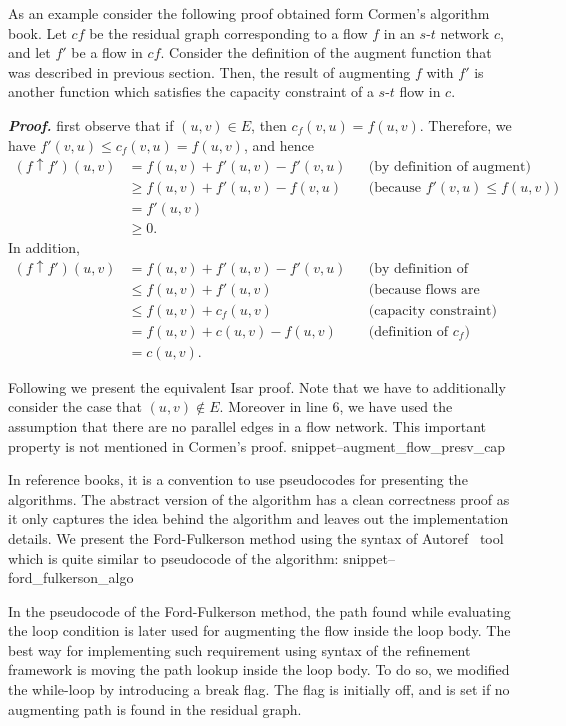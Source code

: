 \documentclass{llncs}
\newcommand{\Snippet}[1]{\csname snippet--#1\endcsname}
\begin{document}
As an example consider the following proof obtained form Cormen's algorithm book. Let $cf$ be the residual graph corresponding to a flow $f$ in an $s$-$t$ network $c$, and let $f'$ be a flow in $cf$. Consider the definition of the augment function that was described in previous section. Then, the result of augmenting $f$ with $f'$ is another function which satisfies the capacity constraint of a $s$-$t$ flow in $c$.

\emph{\textbf{Proof.}} first observe that if $(u, v) \in E$, then $c_f(v, u) = f(u, v)$. Therefore, we have $f'(v,u) \leq c_f(v, u) = f(u, v)$, and hence
	\begin{align*}
	(f \uparrow f') (u, v) &= f(u, v) + f'(u, v) - f'(v, u)  && \text{(by definition of augment)} \\
	& \geq f(u, v) + f'(u, v) - f(v, u) && \text{(because $f'(v,u) \leq f(u, v)$)} \\
	& = f'(u, v) \\
	& \geq 0.
	\end{align*}
In addition,
	\begin{align*}
	(f \uparrow f') (u, v) &= f(u, v) + f'(u, v) - f'(v, u)  && \text{(by definition of augment)} \\
	& \leq f(u, v) + f'(u, v) && \text{(because flows are nonnegative)} \\
	& \leq f(u, v) + c_f(u, v) &&  \text{(capacity constraint)} \\
	& = f(u, v) + c(u, v) - f(u, v) && \text{(definition of $c_f$)} \\
	& = c (u, v).
	\end{align*}

Following we present the equivalent Isar proof. Note that we have to additionally consider the case that $(u, v) \notin E$. Moreover in line 6, we have used the assumption that there are no parallel edges in a flow network. This important property is not mentioned in Cormen's proof.
\Snippet{augment_flow_presv_cap}


In reference books, it is a convention to use pseudocodes for presenting the algorithms. The abstract version of the algorithm has a clean correctness proof as it only captures the idea behind the algorithm and leaves out the implementation details. We present the Ford-Fulkerson method using the syntax of Autoref~\cite{La13} tool which is quite similar to pseudocode of the algorithm:
\Snippet{ford_fulkerson_algo}

In the pseudocode of the Ford-Fulkerson method, the path found while evaluating the loop condition is later used for augmenting the flow inside the loop body. The best way for implementing such requirement using syntax of the refinement framework is moving the path lookup inside the loop body. To do so, we modified the while-loop by introducing a break flag. The flag is initially off, and is set if no augmenting path is found in the residual graph.
\end{document}

